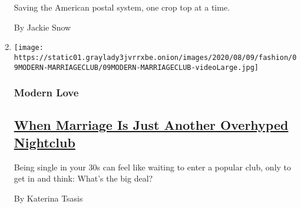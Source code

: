 \begin{enumerate}
  Saving the American postal system, one crop top at a time.

  By Jackie Snow
\item
  \texttt{[image: https://static01.graylady3jvrrxbe.onion/images/2020/08/09/fashion/09MODERN-MARRIAGECLUB/09MODERN-MARRIAGECLUB-videoLarge.jpg]}

  \hypertarget{modern-love}{%
  \subsubsection{Modern Love}\label{modern-love}}

  \hypertarget{when-marriage-is-just-another-overhyped-nightclub}{%
  \subsection{\texorpdfstring{\href{/2020/08/07/style/modern-love-when-marriage-is-just-another-overhyped-nightclub.html}{When
  Marriage Is Just Another Overhyped
  Nightclub}}{When Marriage Is Just Another Overhyped Nightclub}}\label{when-marriage-is-just-another-overhyped-nightclub}}

  Being single in your 30s can feel like waiting to enter a popular
  club, only to get in and think: What's the big deal?

  By Katerina Tsasis
\end{enumerate}

